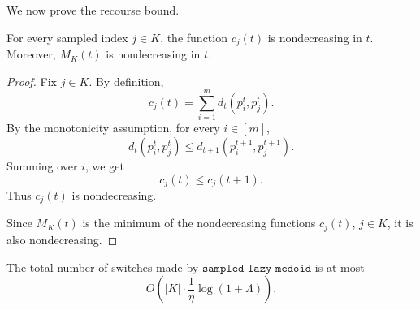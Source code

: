 We now prove the recourse bound.

\begin{lemma}
\label{lem:metric-costs-monotone}
For every sampled index \(j\in K\), the function \(c_j(t)\) is nondecreasing in \(t\). Moreover, \(M_K(t)\) is nondecreasing in \(t\).
\end{lemma}

\begin{proof}
Fix \(j\in K\). By definition,
\[
    c_j(t)
    =
    \sum_{i=1}^m d_t(p_i^t,p_j^t).
\]
By the monotonicity assumption, for every \(i\in[m]\),
\[
    d_t(p_i^t,p_j^t)
    \le
    d_{t+1}(p_i^{t+1},p_j^{t+1}).
\]
Summing over \(i\), we get
\[
    c_j(t)\le c_j(t+1).
\]
Thus \(c_j(t)\) is nondecreasing.

Since \(M_K(t)\) is the minimum of the nondecreasing functions \(c_j(t)\), \(j\in K\), it is also nondecreasing.
\end{proof}

\begin{lemma}
\label{lem:metric-switching-bound}
The total number of switches made by \(\texttt{sampled-lazy-medoid}\) is at most
\[
    O\left(
        |K|\cdot
        \frac{1}{\eta}
        \log(1+\Lambda)
    \right).
\]
\end{lemma}

